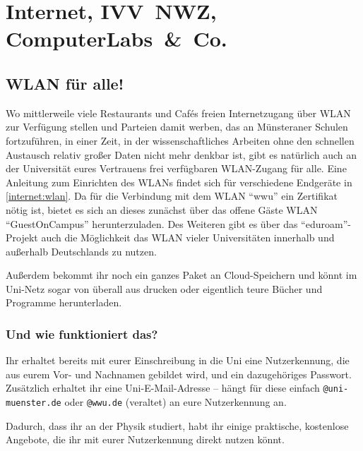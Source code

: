 \section{Internet, IVV~NWZ, Computer\-Labs~\&~Co.}
\begin{multicols}{2}
\subsection{WLAN für alle!}

Wo mittlerweile viele Restaurants und Cafés freien Internetzugang über WLAN zur Verfügung stellen und Parteien damit werben, das an Münsteraner Schulen fortzuführen, in einer Zeit, in der wissenschaftliches Arbeiten ohne den schnellen Austausch relativ großer Daten nicht mehr denkbar ist, gibt es natürlich auch an der Universität eures Vertrauens frei verfügbaren WLAN-Zugang für alle.
Eine Anleitung zum Einrichten des WLANs findet sich für verschiedene Endgeräte in \cref{internet:wlan}.
Da für die Verbindung mit dem WLAN \enquote{wwu} ein Zertifikat nötig ist, bietet es sich an dieses zunächst über das offene Gäste WLAN \enquote{GuestOnCampus} herunterzuladen.
Des Weiteren gibt es über das \enquote{eduroam}-Projekt auch die Möglichkeit das WLAN vieler Universitäten innerhalb und außerhalb Deutschlands zu nutzen.

Außerdem bekommt ihr noch ein ganzes Paket an Cloud-Speichern und könnt im Uni-Netz sogar von überall aus drucken oder eigentlich teure Bücher und Programme herunterladen.

\subsubsection{Und wie funktioniert das?}
Ihr erhaltet bereits mit eurer Einschreibung in die Uni eine Nutzerkennung, die aus eurem Vor- und Nachnamen gebildet wird, und ein dazugehöriges Passwort.
Zusätzlich erhaltet ihr eine Uni-E-Mail-Adresse -- hängt für diese einfach \texttt{@uni-muenster.de} oder \texttt{@wwu.de} (veraltet) an eure Nutzerkennung an.

Dadurch, dass ihr an der \UniMuenster{} Physik studiert, habt ihr einige praktische, kostenlose Angebote, die ihr mit eurer Nutzerkennung direkt nutzen könnt.


\end{multicols}
